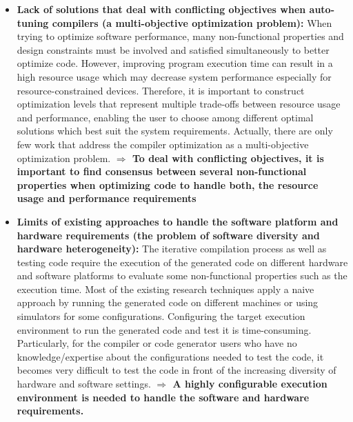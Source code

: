 \begin{itemize}
\item \textbf{Lack of solutions that deal with conflicting objectives when auto-tuning compilers (a multi-objective optimization problem):} 
When trying to optimize software performance, many non-functional properties and design constraints
must be involved and satisfied simultaneously to better optimize code. However, improving program
execution time can result in a high resource usage which may decrease system performance especially for resource-constrained devices. Therefore, it is important to construct optimization levels that represent multiple trade-offs between resource usage and performance, enabling the user to choose among different optimal solutions which best suit the system requirements. Actually, there are only few work that address the compiler optimization as a multi-objective optimization problem. 
\newline
\textbf{$\Rightarrow$ To deal with conflicting objectives, it is important to find  consensus between several non-functional properties when optimizing code to handle both, the resource usage and performance requirements}


\item \textbf{Limits of existing approaches to handle the software platform and hardware requirements (the problem of software diversity and hardware heterogeneity):} The iterative compilation process as well as testing code  require the execution of the generated code on different hardware and software platforms to evaluate some non-functional properties such as the execution time. Most of the existing research techniques apply a naive approach by running the generated code on different machines or using simulators for some configurations. Configuring the target execution environment to run the generated code and test it is time-consuming. Particularly, for the compiler or code generator users who have no knowledge/expertise about the configurations needed to test the code, it becomes very difficult to test the code in front of the increasing diversity of hardware and software settings.\newline
\textbf{$\Rightarrow$ A highly configurable execution environment is needed to handle the software and hardware requirements.} 


\end{itemize}
